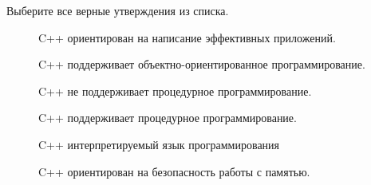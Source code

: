 \documentclass[9pt]{beamer}
\begin{document}
\begin{frame}
    Выберите все верные утверждения из списка.
    \begin{description}
        \item[\XBox]  C++ ориентирован на написание эффективных
        приложений.
        \item[\XBox]  C++ поддерживает объектно-ориентированное
        программирование.
        \item[\Square]  C++ не поддерживает процедурное
        программирование.
        \item[\XBox]  C++ поддерживает процедурное
        программирование.
        \item[\Square]  C++ интерпретируемый язык программирования
        \item[\Square]  C++ ориентирован на безопасность работы с памятью.
    \end{description}
\end{frame}
\end{document}
